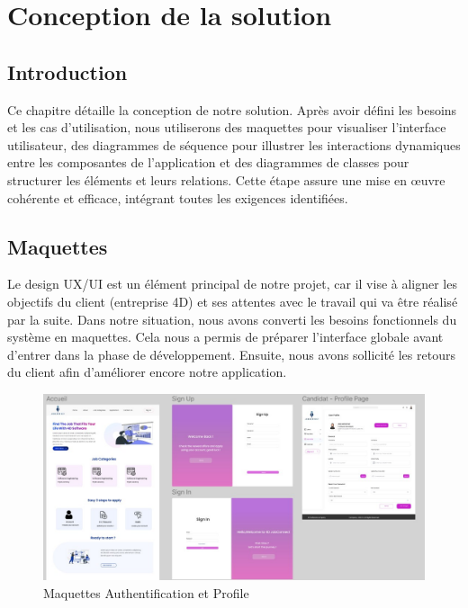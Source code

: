 

\chapter{Conception de la solution}
\pagestyle{chapterstyle}

\newpage
\vspace{1cm}

\section{Introduction}
Ce chapitre détaille la conception de notre solution. Après avoir défini les 
besoins et les cas d'utilisation, nous utiliserons des maquettes 
pour visualiser l'interface utilisateur, des diagrammes de séquence 
pour illustrer les interactions dynamiques entre les composantes 
de l'application et des diagrammes de classes pour structurer les 
éléments et leurs relations. Cette étape assure une mise en œuvre 
cohérente et efficace, intégrant toutes les exigences identifiées.

\section{Maquettes}
Le design UX/UI est un élément principal de notre projet, 
car il vise à aligner les objectifs du client (entreprise 4D) et ses attentes avec 
le travail qui va être réalisé par la suite.
\newline
Dans notre situation, nous avons converti les besoins fonctionnels du système 
en maquettes. Cela nous a permis de préparer l'interface globale 
avant d'entrer dans la phase de développement. Ensuite, 
nous avons sollicité les retours du client 
afin d'améliorer encore notre application.
\newline
\vspace{4cm}



\begin{figure}[htbp]
   \centering
   \includegraphics[scale=0.8]{Images/1.jpg} %
   \caption{Maquettes Authentification et Profile}
   \label{fig:maquette1}
\end{figure}
\vspace{1cm}

